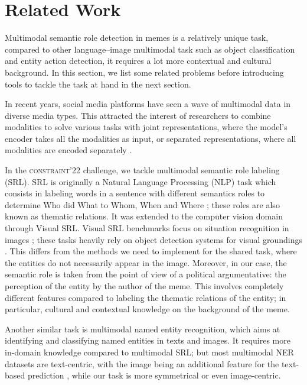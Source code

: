 \section{Related Work} \label{sec:literature}

Multimodal semantic role detection in memes is a relatively unique task, compared to other language--image multimodal task such as object classification and entity action detection, it requires a lot more contextual and cultural background.
In this section, we list some related problems before introducing tools to tackle the task at hand in the next section.


In recent years, social media platforms have seen a wave of multimodal data in diverse media types. This attracted the interest of researchers to combine modalities to solve various tasks with joint representations, where the model's encoder takes all the modalities as input, or separated representations, where all modalities are encoded separately \cite{baltruvsaitis2018multimodal}. 


In the \textsc{constraint}'22 challenge, we tackle multimodal semantic role labeling (SRL). SRL is originally a Natural Language Processing (NLP) task which consists in labeling words in a sentence with different semantics roles to determine Who did What to Whom, When and Where \cite{gildea2002automatic,carreras2005introduction}; these roles are also known as thematic relations. It was extended to the computer vision domain through Visual SRL. Visual SRL benchmarks focus on situation recognition in images \cite{silberer-pinkal-2018-grounding,pratt2020grounded}; these tasks heavily rely on object detection systems for visual groundings \cite{yang2019detecting}. This differs from the methods we need to implement for the shared task, where the entities do not necessarily appear in the image.
Moreover, in our case, the semantic role is taken from the point of view of a political argumentative: the perception of the entity by the author of the meme. This involves completely different features compared to labeling the thematic relations of the entity; in particular, cultural and contextual knowledge on the background of the meme.
 
Another similar task is multimodal named entity recognition, which aims at identifying and classifying named entities in texts and images. It requires more in-domain knowledge compared to multimodal SRL; but most multimodal NER datasets are text-centric, with the image being an additional feature for the text-based prediction
\cite{arshad2019aiding,chen-etal-2021-images}, while our task is more symmetrical or even image-centric. 

